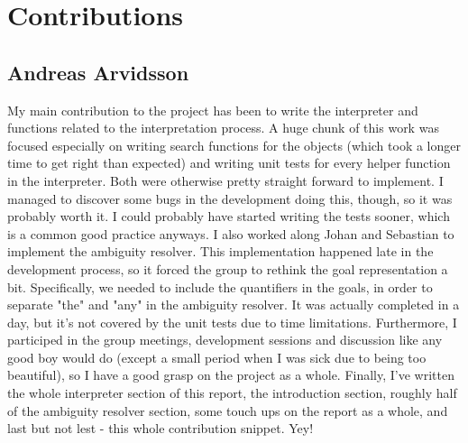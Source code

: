 \section*{Contributions}
\subsection*{Andreas Arvidsson}
My main contribution to the project has been to write the interpreter and functions related to the interpretation process.
A huge chunk of this work was focused especially on writing search functions for the objects (which took a longer time to get right than expected) and writing unit tests for every helper function in the interpreter.
Both were otherwise pretty straight forward to implement.
I managed to discover some bugs in the development doing this, though, so it was probably worth it. I could probably have started writing the tests sooner, which is a common good practice anyways.
\newline
\newline
I also worked along Johan and Sebastian to implement the ambiguity resolver.
This implementation happened late in the development process, so it forced the group to rethink the goal representation a bit.
Specifically, we needed to include the quantifiers in the goals, in order to separate "the" and "any" in the ambiguity resolver.
It was actually completed in a day, but it's not covered by the unit tests due to time limitations.
\newline
\newline
Furthermore, I participed in the group meetings, development sessions and discussion like any good boy would do (except a small period when I was sick due to being too beautiful), so I have a good grasp on the project as a whole.
\newline
\newline
Finally, I've written the whole interpreter section of this report, the introduction section, roughly half of the ambiguity resolver section, some touch ups on the report as a whole, and last but not lest - this whole contribution snippet. Yey!

